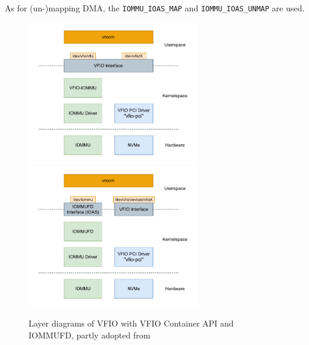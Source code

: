 As for (un-)mapping DMA, the \texttt{IOMMU\_IOAS\_MAP} and \texttt{IOMMU\_IOAS\_UNMAP} are used.


\begin{figure}[H]
    \centering
     {\includegraphics[width=0.67\textwidth]{figures/VFIOLayer.pdf}}
     {\includegraphics[width=0.67\textwidth]{figures/IOMMUFDLayer.pdf}}
    \caption{Layer diagrams of VFIO with VFIO Container API and IOMMUFD, partly adopted from \cite{dpdkiommufd}}
    \label{fig:layer}
\end{figure}

